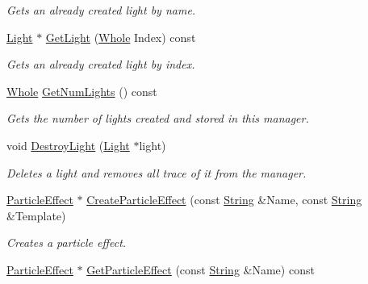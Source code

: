 \begin{DoxyCompactItemize}
\begin{DoxyCompactList}\small\item\em Gets an already created light by name. \item\end{DoxyCompactList}\item 
\hyperlink{classphys_1_1Light}{Light} $\ast$ \hyperlink{classphys_1_1SceneManager_a3c5aaeb80eed8032d6f9417073d2be8b}{GetLight} (\hyperlink{namespacephys_a460f6bc24c8dd347b05e0366ae34f34a}{Whole} Index) const 
\begin{DoxyCompactList}\small\item\em Gets an already created light by index. \item\end{DoxyCompactList}\item 
\hyperlink{namespacephys_a460f6bc24c8dd347b05e0366ae34f34a}{Whole} \hyperlink{classphys_1_1SceneManager_aa1eaa692e63a6d8e328d2f0e4a2f9bf8}{GetNumLights} () const 
\begin{DoxyCompactList}\small\item\em Gets the number of lights created and stored in this manager. \item\end{DoxyCompactList}\item 
void \hyperlink{classphys_1_1SceneManager_a0f6ebec4e8a372b0fcc2b2205bac7725}{DestroyLight} (\hyperlink{classphys_1_1Light}{Light} $\ast$light)
\begin{DoxyCompactList}\small\item\em Deletes a light and removes all trace of it from the manager. \item\end{DoxyCompactList}\item 
\hyperlink{classphys_1_1ParticleEffect}{ParticleEffect} $\ast$ \hyperlink{classphys_1_1SceneManager_a67a33ba38c8e8b198c52ca7bcf847751}{CreateParticleEffect} (const \hyperlink{namespacephys_aa03900411993de7fbfec4789bc1d392e}{String} \&Name, const \hyperlink{namespacephys_aa03900411993de7fbfec4789bc1d392e}{String} \&Template)
\begin{DoxyCompactList}\small\item\em Creates a particle effect. \item\end{DoxyCompactList}\item 
\hyperlink{classphys_1_1ParticleEffect}{ParticleEffect} $\ast$ \hyperlink{classphys_1_1SceneManager_af1f8d6b77b1088dea72685719ff6936f}{GetParticleEffect} (const \hyperlink{namespacephys_aa03900411993de7fbfec4789bc1d392e}{String} \&Name) const 

\end{DoxyCompactItemize}
